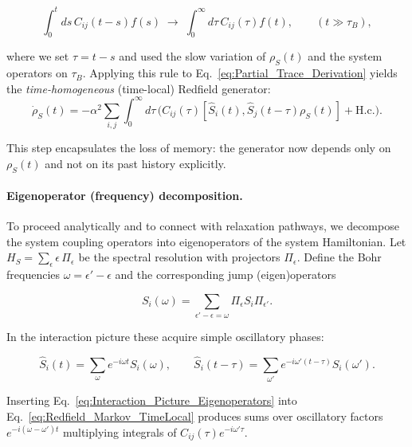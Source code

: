 \begin{equation}
	\int_0^t ds\, C_{ij}(t-s) f(s) \; \longrightarrow \; \int_0^{\infty} d\tau\, C_{ij}(\tau) f(t), \qquad (t \gg \tau_B),
	\label{eq:Markov_extension_rule}
\end{equation}

\noindent
where we set $\tau = t-s$ and used the slow variation of $\rho_S(t)$ and the system operators on $\tau_B$. Applying this rule to Eq.~\eqref{eq:Partial_Trace_Derivation} yields the \emph{time-homogeneous} (time-local) Redfield generator:
\begin{equation}
	\dot{\rho}_S(t) = - \alpha^2 \sum_{i,j} \int_0^{\infty} d\tau \, \Big( C_{ij}(\tau) [\hat{S}_i(t), \hat{S}_j(t-\tau) \rho_S(t)] + \text{H.c.}\Big).
	\label{eq:Redfield_Markov_TimeLocal}
\end{equation}

\noindent
This step encapsulates the loss of memory: the generator now depends only on $\rho_S(t)$ and not on its past history explicitly.


\paragraph{Eigenoperator (frequency) decomposition.}

\noindent
To proceed analytically and to connect with relaxation pathways, we decompose the system coupling operators into eigenoperators of the system Hamiltonian. Let $H_S = \sum_{\epsilon} \epsilon \, \Pi_{\epsilon}$ be the spectral resolution with projectors $\Pi_{\epsilon}$. Define the Bohr frequencies $\omega = \epsilon' - \epsilon$ and the corresponding jump (eigen)operators

\begin{equation}
	S_i(\omega) = \sum_{\epsilon' - \epsilon = \omega} \Pi_{\epsilon} S_i \Pi_{\epsilon'}.
	\label{eq:Eigenoperator_Decomposition}
\end{equation}

\noindent
In the interaction picture these acquire simple oscillatory phases:

\begin{equation}
	\hat{S}_i(t) = \sum_{\omega} e^{-i \omega t} S_i(\omega), \qquad \hat{S}_i(t-\tau) = \sum_{\omega'} e^{-i \omega'(t-\tau)} S_i(\omega').
	\label{eq:Interaction_Picture_Eigenoperators}
\end{equation}

\noindent
Inserting Eq.~\eqref{eq:Interaction_Picture_Eigenoperators} into Eq.~\eqref{eq:Redfield_Markov_TimeLocal} produces sums over oscillatory factors $e^{-i(\omega - \omega') t}$ multiplying integrals of $C_{ij}(\tau) e^{-i \omega' \tau}$.

